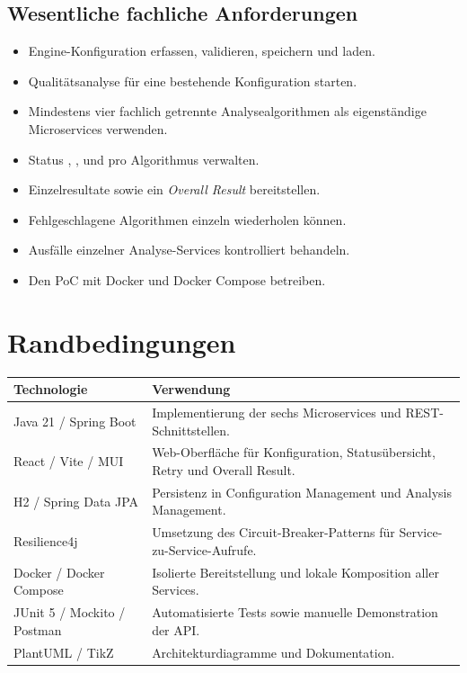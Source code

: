 \subsection{Wesentliche fachliche Anforderungen}
\begin{itemize}
  \item Engine-Konfiguration erfassen, validieren, speichern und laden.
  \item Qualitätsanalyse für eine bestehende Konfiguration starten.
  \item Mindestens vier fachlich getrennte Analysealgorithmen als eigenständige Microservices verwenden.
  \item Status , ,  und  pro Algorithmus verwalten.
  \item Einzelresultate sowie ein \emph{Overall Result} bereitstellen.
  \item Fehlgeschlagene Algorithmen einzeln wiederholen können.
  \item Ausfälle einzelner Analyse-Services kontrolliert behandeln.
  \item Den PoC mit Docker und Docker Compose betreiben.
\end{itemize}

\newpage

\section{Randbedingungen}
\begin{tabularx}{\textwidth}{L{4.2cm}Y}
\toprule
\textbf{Technologie} & \textbf{Verwendung} \\
\midrule
Java 21 / Spring Boot & Implementierung der sechs Microservices und REST-Schnittstellen. \\
React / Vite / MUI & Web-Oberfläche für Konfiguration, Statusübersicht, Retry und Overall Result. \\
H2 / Spring Data JPA & Persistenz in Configuration Management und Analysis Management. \\
Resilience4j & Umsetzung des Circuit-Breaker-Patterns für Service-zu-Service-Aufrufe. \\
Docker / Docker Compose & Isolierte Bereitstellung und lokale Komposition aller Services. \\
JUnit 5 / Mockito / Postman & Automatisierte Tests sowie manuelle Demonstration der API. \\
PlantUML / TikZ & Architekturdiagramme und Dokumentation. \\
\bottomrule
\end{tabularx}

